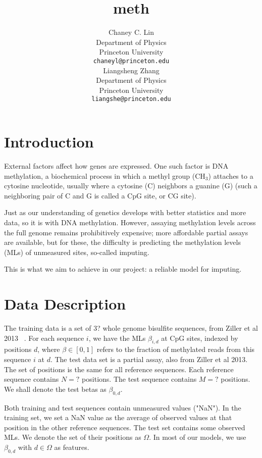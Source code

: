 \documentclass{article} %
\title{meth}
\author{
Chaney C. Lin\\
Department of Physics\\
Princeton University\\
\texttt{chaneyl@princeton.edu} \\
\And
Liangsheng Zhang\\
Department of Physics\\
Princeton University\\
\texttt{liangshe@princeton.edu} \\
}
\begin{document}
\maketitle

\begin{abstract}
\end{abstract}
\section{Introduction}

External factors affect how genes are expressed. One such factor is DNA methylation, a biochemical process in which a methyl group (CH$_3$) attaches to a cytosine nucleotide, usually where a cytosine (C) neighbors a guanine (G) (such a neighboring pair of C and G is called a CpG site, or CG site).

Just as our understanding of genetics develops with better statistics and more data, so it is with DNA methylation. However, assaying methylation levels across the full genome remains prohibitively expensive; more affordable partial assays are available, but for these, the difficulty is predicting the methylation levels (MLs) of unmeasured sites, so-called imputing.

This is what we aim to achieve in our project: a reliable model for imputing.

\section{Data Description}

The training data is a set of 3? whole genome bisulfite sequences, from Ziller et al 2013 ~\cite{ziller2013charting}. For each sequence $i$, we have the MLs $\beta_{i,d}$ at CpG sites, indexed by positions $d$, where $\beta \in [0,1]$ refers to the fraction of methylated reads from this sequence $i$ at $d$. The test data set is a partial assay, also from Ziller et al 2013. The set of positions is the same for all reference sequences. Each reference sequence contains $N=?$ positions. The test sequence contains $M=?$ positions. We shall denote the test betas as $\beta_{0,d}$.

Both training and test sequences contain unmeasured values ("NaN"). In the training set, we set a NaN value as the average of observed values at that position in the other reference sequences. The test set contains some observed MLs. We denote the set of their positions as $\Omega$. In most of our models, we use $\beta_{0,d}$ with $d \in \Omega$ as features.
\end{document}
